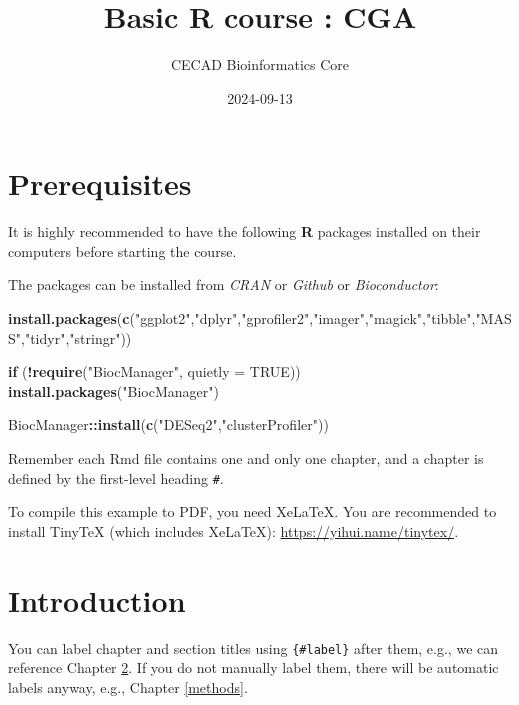 \documentclass[
]{book}
\title{Basic R course : CGA}
\author{CECAD Bioinformatics Core}
\date{2024-09-13}
\newenvironment{Shaded}{\begin{snugshade}}{\end{snugshade}}
\newcommand{\AttributeTok}[1]{\textcolor[rgb]{0.13,0.29,0.53}{#1}}
\newcommand{\ConstantTok}[1]{\textcolor[rgb]{0.56,0.35,0.01}{#1}}
\newcommand{\ControlFlowTok}[1]{\textcolor[rgb]{0.13,0.29,0.53}{\textbf{#1}}}
\newcommand{\FunctionTok}[1]{\textcolor[rgb]{0.13,0.29,0.53}{\textbf{#1}}}
\newcommand{\NormalTok}[1]{#1}
\newcommand{\SpecialCharTok}[1]{\textcolor[rgb]{0.81,0.36,0.00}{\textbf{#1}}}
\newcommand{\StringTok}[1]{\textcolor[rgb]{0.31,0.60,0.02}{#1}}
\begin{document}
\maketitle

{
\setcounter{tocdepth}{1}
\tableofcontents
}
\chapter{Prerequisites}\label{prerequisites}

It is highly recommended to have the following \textbf{R} packages installed on their
computers before starting the course.

The packages can be installed from \emph{CRAN} or \emph{Github} or \emph{Bioconductor}:

\begin{Shaded}
\begin{Highlighting}[]
\FunctionTok{install.packages}\NormalTok{(}\FunctionTok{c}\NormalTok{(}\StringTok{"ggplot2"}\NormalTok{,}\StringTok{"dplyr"}\NormalTok{,}\StringTok{"gprofiler2"}\NormalTok{,}\StringTok{"imager"}\NormalTok{,}\StringTok{"magick"}\NormalTok{,}\StringTok{"tibble"}\NormalTok{,}\StringTok{"MASS"}\NormalTok{,}\StringTok{"tidyr"}\NormalTok{,}\StringTok{"stringr"}\NormalTok{))}

\ControlFlowTok{if}\NormalTok{ (}\SpecialCharTok{!}\FunctionTok{require}\NormalTok{(}\StringTok{"BiocManager"}\NormalTok{, }\AttributeTok{quietly =} \ConstantTok{TRUE}\NormalTok{))}
    \FunctionTok{install.packages}\NormalTok{(}\StringTok{"BiocManager"}\NormalTok{)}

\NormalTok{BiocManager}\SpecialCharTok{::}\FunctionTok{install}\NormalTok{(}\FunctionTok{c}\NormalTok{(}\StringTok{"DESeq2"}\NormalTok{,}\StringTok{"clusterProfiler"}\NormalTok{))}
\end{Highlighting}
\end{Shaded}

Remember each Rmd file contains one and only one chapter, and a chapter is defined by the first-level heading \texttt{\#}.

To compile this example to PDF, you need XeLaTeX. You are recommended to install TinyTeX (which includes XeLaTeX): \url{https://yihui.name/tinytex/}.

\chapter{Introduction}\label{intro}

You can label chapter and section titles using \texttt{\{\#label\}} after them, e.g., we can reference Chapter \ref{intro}. If you do not manually label them, there will be automatic labels anyway, e.g., Chapter \ref{methods}.
\end{document}
